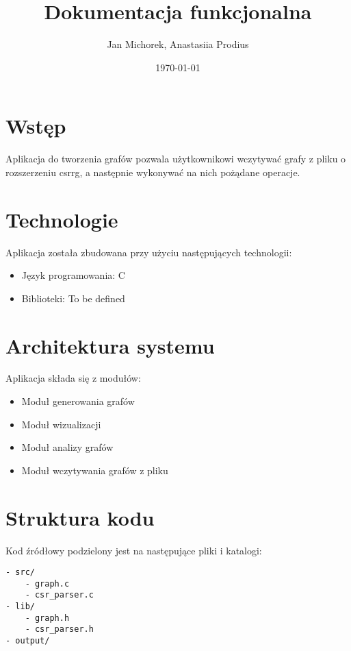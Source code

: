 \documentclass[a4paper,12pt]{article}
\title{Dokumentacja funkcjonalna}
\author{Jan Michorek, Anastasiia Prodius}
\date{\today}
\begin{document}
\maketitle

\tableofcontents

\section{Wstęp}
Aplikacja do tworzenia grafów pozwala użytkownikowi wczytywać grafy z pliku 
o rozszerzeniu csrrg, a następnie wykonywać na nich pożądane operacje.

\section{Technologie}
Aplikacja została zbudowana przy użyciu następujących technologii:
\begin{itemize}
    \item Język programowania: C
    \item Biblioteki: To be defined 

\end{itemize}

\section{Architektura systemu}
Aplikacja składa się z modułów:
\begin{itemize}
    \item Moduł generowania grafów
    \item Moduł wizualizacji
    \item Moduł analizy grafów
    \item Moduł wczytywania grafów z pliku
\end{itemize}

\section{Struktura kodu}
Kod źródłowy podzielony jest na następujące pliki i katalogi:
\begin{verbatim}
- src/
    - graph.c
    - csr_parser.c
- lib/
    - graph.h
    - csr_parser.h
- output/
\end{verbatim}
\end{document}

